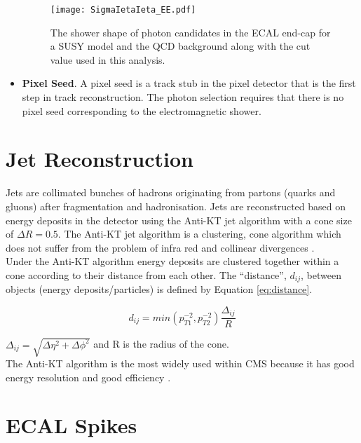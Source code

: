 \begin{itemize}
\begin{figure}
\begin{center}
\texttt{[image: SigmaIetaIeta\_EE.pdf]}
\end{center}
\caption{The shower shape of photon candidates in the ECAL end-cap for a SUSY 
model and the QCD background along with the cut value used in this analysis.} 
\label{fig:SigmaIetaIeta_EE}
\end{figure}

\item {\bf Pixel Seed}. A pixel seed is a track stub in the pixel detector that 
is the first step in track reconstruction. The photon selection requires that 
there is no pixel seed corresponding to the electromagnetic shower.
\end{itemize}

\section{Jet Reconstruction}

Jets are collimated bunches of hadrons originating from partons (quarks and 
gluons) after fragmentation and hadronisation. Jets are reconstructed based on 
energy deposits in the detector using the Anti-KT jet algorithm with a cone 
size of $\Delta R = 0.5$. The Anti-KT jet algorithm is a clustering, cone 
algorithm which does not suffer from the problem of infra red and collinear 
divergences \cite{antikt}. \\

Under the Anti-KT algorithm energy deposits are clustered together within a cone
according to their distance from each other. The ``distance'', $d_{ij}$, between 
objects (energy deposits/particles) is defined by Equation \ref{eq:distance}.

\begin{equation}
d_{ij} = min(p_{T1}^{-2}, p_{T2}^{-2})\frac{\Delta_{ij}}{R}
\label{eq:distance}
\end{equation}

$\Delta_{ij} = \sqrt{\Delta \eta^{2} + \Delta \phi^{2}}$ and R is the radius of
the cone. \\

The Anti-KT algorithm is the most widely used within CMS because it has good
energy resolution and good efficiency \cite{ak5best}.

\section{ECAL Spikes}

